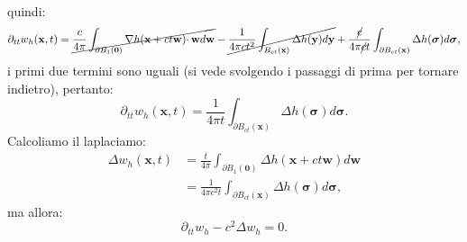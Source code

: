 \documentclass[10pt,a4paper,twoside,openright]{book}
\begin{document}
\begin{dimostrazione}
\begin{align*}
	\end{align*}
	quindi:
	\begin{equation*}
		\partial _{tt} w_{h}(\mathbf{x} ,t) =\cancel{\frac{c}{4\pi }\int _{\partial B_{1}(\mathbf{0})} \nabla h(\mathbf{x} +ct\mathbf{w}) \cdotp \mathbf{w} d\mathbf{w}} -\cancel{\frac{1}{4\pi ct^{2}}\int _{B_{ct}(\mathbf{x})} \Delta h(\mathbf{y}) d\mathbf{y}} +\frac{\cancel{c}}{4\pi \cancel{c} t}\int _{\partial B_{ct}(\mathbf{x})} \Delta h(\bm{\sigma }) d\bm{\sigma } ,
	\end{equation*}
	i primi due termini sono uguali (si vede svolgendo i passaggi di prima per tornare indietro), pertanto:
	\begin{equation*}
		\partial _{tt} w_{h}(\mathbf{x} ,t) =\frac{1}{4\pi t}\int _{\partial B_{ct}(\mathbf{x})} \Delta h(\bm{\sigma }) d\bm{\sigma } .
	\end{equation*}
	Calcoliamo il laplaciamo:
	\begin{align*}
		\Delta w_{h}(\mathbf{x} ,t) & =\frac{t}{4\pi }\int _{\partial B_{1}(\mathbf{0})} \Delta h(\mathbf{x} +ct\mathbf{w}) d\mathbf{w} \\
		                            & =\frac{1}{4\pi c^{2} t}\int _{\partial B_{ct}(\mathbf{x})} \Delta h(\bm{\sigma }) d\bm{\sigma } , 
	\end{align*}
	ma allora:
	\begin{equation*}
		\partial _{tt} w_{h} -c^{2} \Delta w_{h} =0.
	\end{equation*}
\end{dimostrazione}
\end{document}
